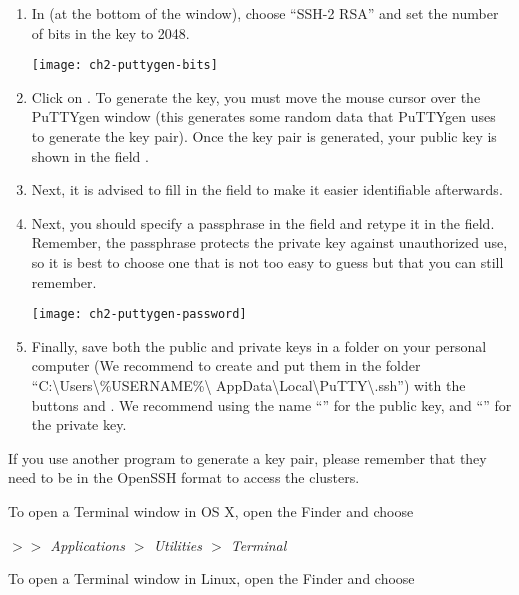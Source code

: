   \begin{enumerate}
    \item  In  (at the bottom of the window), choose
      ``SSH-2 RSA'' and set the number of bits in the key to 2048.

    \texttt{[image: ch2-puttygen-bits]}

    \item  Click on . To generate the key, you must move
      the mouse cursor over the PuTTYgen window (this generates some random
      data that PuTTYgen uses to generate the key pair). Once the key pair is
      generated, your public key is shown in the field .
    \item  Next, it is advised to fill in the  field
      to make it easier identifiable afterwards.
    \item  Next, you should specify a passphrase in the 
      field and retype it in the  field.
      Remember, the passphrase protects the private key against unauthorized
      use, so it is best to choose one that is not too easy to guess but that
      you can still remember.

    \texttt{[image: ch2-puttygen-password]}

    \item  Finally, save both the public and private keys in a folder on your
      personal computer (We recommend to create and put them in the folder
      ``C:\textbackslash Users\textbackslash \%USERNAME\%\textbackslash
      AppData\textbackslash Local\textbackslash PuTTY\textbackslash .ssh'')
      with the buttons  and .
      We recommend using the name ``'' for the public key,
      and ``'' for the private key.
  \end{enumerate}

  If you use another program to generate a key pair, please remember that they
  need to be in the OpenSSH format to access the \hpc clusters.
\fi %

\ifmac
  To open a Terminal window in OS X, open the Finder and choose

  \emph{$>$$>$ Applications $>$ Utilities $>$ Terminal}
\fi

\iflinux
  To open a Terminal window in Linux, open the Finder and choose

